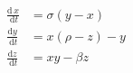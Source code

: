 \documentclass[preview]{standalone}
\begin{document}
\begin{center}
\[
            \begin{aligned}
            \frac{\mathrm{d} \, {x}}{\mathrm{~d} {t}} & = \sigma ({y} - {x}) \\
            \frac{\mathrm{d} {y}}{\mathrm{~d} {t}} & = {x} (\rho - {z}) - {y} \\
            \frac{\mathrm{d} {z}}{\mathrm{~d} {t}} & = {x} {y} - \beta {z}
            \end{aligned}
            \]
\end{center}
\end{document}
